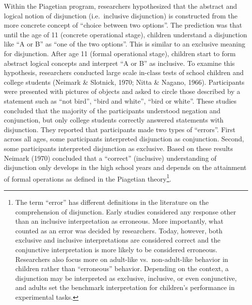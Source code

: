 \documentclass[,man,floatsintext]{apa6}
\let\rmarkdownfootnote\footnote%
\def\footnote{\protect\rmarkdownfootnote}
\begin{document}
Within the Piagetian program, researchers hypothesized that the abstract and logical notion of disjunction (i.e.~inclusive disjunction) is constructed from the more concrete concept of \enquote{choice between two options}. The prediction was that until the age of 11 (concrete operational stage), children understand a disjunction like \enquote{A or B} as \enquote{one of the two options}. This is similar to an exclusive meaning for disjunction. After age 11 (formal operational stage), children start to form abstract logical concepts and interpret \enquote{A or B} as inclusive. To examine this hypothesis, researchers conducted large scale in-class tests of school children and college students (Neimark \& Slotnick, 1970; Nitta \& Nagano, 1966). Participants were presented with pictures of objects and asked to circle those described by a statement such as \enquote{not bird}, \enquote{bird and white}, \enquote{bird or white}. These studies concluded that the majority of the participants understood negation and conjunction, but only college students correctly answered statements with disjunction. They reported that participants made two types of \enquote{errors}. First across all ages, some participants interpreted disjunction as conjunction. Second, some participants interpreted disjunction as exclusive. Based on these results Neimark (1970) concluded that a \enquote{correct} (inclusive) understanding of disjunction only develops in the high school years and depends on the attainment of formal operations as defined in the Piagetian theory\footnote{The term \enquote{error} has different definitions in the literature on the comprehension of disjunction. Early studies considered any response other than an inclusive interpretation as erroneous. More importantly, what counted as an error was decided by researchers. Today, however, both exclusive and inclusive interpretations are considered correct and the conjunctive interpretation is more likely to be considered erroneous. Researchers also focus more on adult-like vs.~non-adult-like behavior in children rather than \enquote{erroneous} behavior. Depending on the context, a disjunction may be interpreted as exclusive, inclusive, or even conjunctive, and adults set the benchmark interpretation for children's performance in experimental tasks.}.
\end{document}
